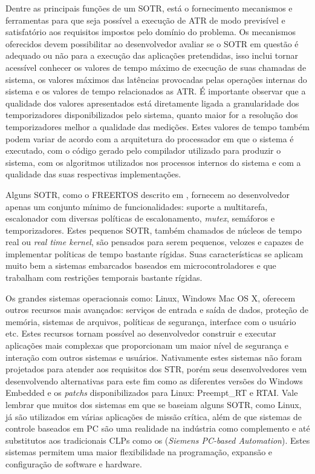 Dentre as principais funções de um SOTR, está o fornecimento mecanismos e ferramentas para que seja possível a execução de ATR de modo previsível e satisfatório aos requisitos impostos pelo domínio do problema. Os mecanismos oferecidos devem possibilitar ao desenvolvedor avaliar se o SOTR em questão é adequado ou não para a execução das aplicações pretendidas, isso inclui tornar acessível conhecer os valores de tempo máximo de execução de suas chamadas de sistema, os valores máximos das latências provocadas pelas operações internas do sistema e os valores de tempo relacionados as ATR. É importante observar que a qualidade dos valores apresentados está diretamente ligada a granularidade dos temporizadores disponibilizados pelo sistema, quanto maior for a resolução dos temporizadores melhor a qualidade das medições. Estes valores de tempo também podem variar de acordo com a arquitetura do processador em que o sistema é executado, com o código gerado pelo compilador utilizado para produzir o sistema, com os algoritmos utilizados nos processos internos do sistema e com a qualidade das suas respectivas implementações.

Alguns SOTR, como o FREERTOS descrito em \cite{Barry2016}, fornecem ao desenvolvedor apenas um conjunto mínimo de funcionalidades: suporte a multitarefa, escalonador com diversas políticas de escalonamento, \textit{mutex}, semáforos e temporizadores. Estes pequenos SOTR, também chamados de núcleos de tempo real ou \textit{ real time kernel}, são pensados para serem pequenos, velozes e capazes de implementar políticas de tempo bastante rígidas. Suas características se aplicam muito bem a sistemas embarcados baseados em microcontroladores e que trabalham com restrições temporais bastante rígidas.

Os grandes sistemas operacionais como: Linux, Windows Mac OS X, oferecem outros recursos mais avançados: serviços de entrada e saída de dados, proteção de memória, sistemas de arquivos, políticas de segurança, interface com o usuário etc. Estes recursos tornam possível ao desenvolvedor construir e executar aplicações mais complexas que proporcionam um maior nível de segurança e interação com outros sistemas e usuários. Nativamente estes sistemas não foram projetados para atender aos requisitos dos STR, porém seus desenvolvedores vem desenvolvendo alternativas para este fim como as diferentes versões do Windows Embedded e os \textit{patchs} disponibilizados para Linux: Preempt\_RT e RTAI. Vale lembrar que muitos dos sistemas em que se baseiam alguns SOTR, como Linux, já são utilizados em várias aplicações de missão crítica, além de que sistemas de controle baseados em PC são uma realidade na indústria como complemento e até substitutos aos tradicionais CLPs como os (\textit{Siemens PC-based Automation}). Estes sistemas permitem uma maior flexibilidade na programação, expansão e configuração de software e hardware.

